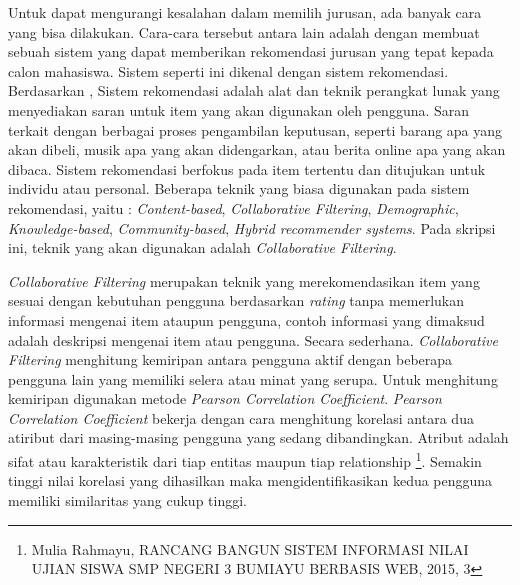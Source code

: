 Untuk dapat mengurangi kesalahan dalam memilih jurusan, ada banyak cara yang bisa dilakukan. Cara-cara tersebut antara lain adalah dengan membuat sebuah sistem yang dapat memberikan rekomendasi jurusan yang tepat kepada calon mahasiswa. Sistem seperti ini dikenal dengan sistem rekomendasi. Berdasarkan \cite{buku:sistem:rekomendasi}, Sistem rekomendasi adalah alat dan teknik perangkat lunak yang menyediakan saran untuk item yang akan digunakan oleh pengguna. Saran terkait dengan berbagai proses pengambilan keputusan, seperti barang apa yang akan dibeli, musik apa yang akan didengarkan, atau berita online apa yang akan dibaca. Sistem rekomendasi berfokus pada item tertentu dan ditujukan untuk individu atau personal. Beberapa teknik yang biasa digunakan pada sistem rekomendasi, yaitu : \textit{Content-based}, \textit{Collaborative Filtering}, \textit{Demographic}, \textit{Knowledge-based}, \textit{Community-based}, \textit{Hybrid recommender systems}. Pada skripsi ini, teknik yang akan digunakan adalah \textit{Collaborative Filtering}.


\textit{Collaborative Filtering} \cite{buku:sistem:rekomendasi} merupakan teknik yang merekomendasikan item yang sesuai dengan kebutuhan pengguna berdasarkan \textit{rating} tanpa memerlukan informasi mengenai item ataupun pengguna, contoh informasi yang dimaksud adalah deskripsi mengenai item atau pengguna. Secara sederhana. \textit{Collaborative Filtering} menghitung kemiripan antara pengguna aktif dengan beberapa pengguna lain yang memiliki selera atau minat yang serupa. Untuk menghitung kemiripan digunakan metode \textit{Pearson Correlation Coefficient}. \textit{Pearson Correlation Coefficient} bekerja dengan cara menghitung korelasi antara dua atiribut dari masing-masing pengguna yang sedang dibandingkan. Atribut adalah sifat atau karakteristik dari tiap entitas maupun tiap relationship \footnote{Mulia Rahmayu, RANCANG BANGUN SISTEM INFORMASI NILAI UJIAN SISWA SMP NEGERI 3 BUMIAYU BERBASIS WEB, 2015, 3}. Semakin tinggi nilai korelasi yang dihasilkan maka mengidentifikasikan kedua pengguna memiliki similaritas yang cukup tinggi. 
 
